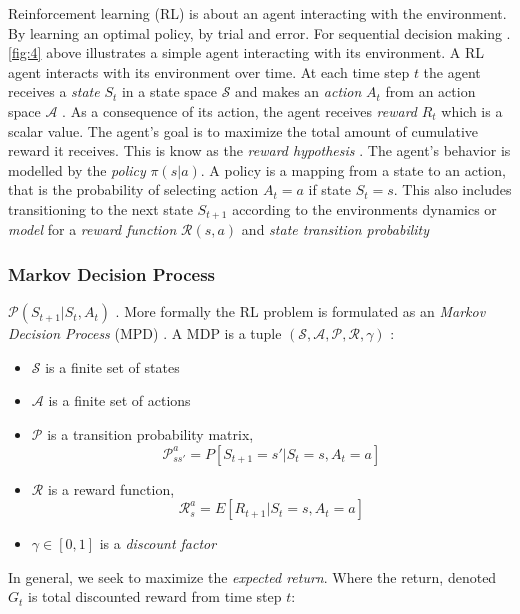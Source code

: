 \documentclass{kththesis}
\theoremstyle{definition}
\begin{document}
Reinforcement learning (RL) is about an agent interacting with the environment. By learning an optimal policy, by trial and error. For sequential decision making \parencite{li2017deep}. \autoref{fig:4} above illustrates a simple agent interacting with its environment. A RL agent interacts with its environment over time. At each time step $t$ the agent receives  a \textit{state} $S_t$ in a state space $\mathcal{S}$ and makes an \textit{action} $A_t$ from an action space $\mathcal{A}$ \parencite{li2017deep}. As a consequence of its action, the agent receives \textit{reward} $R_t$ which is a scalar value. The agent's goal is to maximize the total amount of cumulative reward it receives. This is know as the \textit{reward hypothesis} \parencite{sutton1998reinforcement}. The agent's behavior is modelled by the \textit{policy} $\pi(s|a)$. A policy is a mapping from a state to an action, that is the probability of selecting action $A_t=a$ if state $S_t = s$. 
\newline
\newline
This also includes transitioning to the next state $S_{t+1}$ according to the environments dynamics or \textit{model} for a \textit{reward function} $\mathcal{R}(s,a)$ and \textit{state transition probability}
\subsubsection*{Markov Decision Process}
$\mathcal{P}(S_{t+1} |S_t, A_t)$ \parencite{li2017deep}. More formally the RL problem is formulated as an \textit{Markov Decision Process} (MPD) \parencite{sutton1998reinforcement, li2017deep}. A MDP is a tuple $(\mathcal{S, A, P, R}, \gamma)$ \parencite{li2017deep}:
\begin{itemize}
    \item $\mathcal{S}$ is a finite set of states
    \item $\mathcal{A}$ is a finite set of actions
    \item $\mathcal{P}$ is a transition probability matrix, 
    \begin{equation} 
        \label{eq:12a}
        \mathcal{P}^{a}_{ss'} = P[S_{t+1} = s' | S_t =s, A_t = a]
    \end{equation}
    \item $\mathcal{R}$ is a reward function, 
    \begin{equation}
        \label{eq:12b}
        \mathcal{R}^{a}_{s} = E[R_{t+1} | S_t =s, A_t=a]
    \end{equation}
    \item $\gamma \in [0,1]$ is a \textit{discount factor} 
\end{itemize}
In general, we seek to maximize the \textit{expected return}. Where the return, denoted $G_t$ is total discounted reward from time step $t$:
\end{document}
